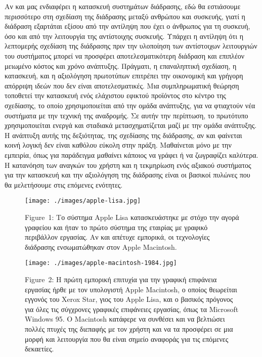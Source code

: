\documentclass[
]{article}
\begin{document}
Αν και μας ενδιαφέρει η κατασκευή συστημάτων διάδρασης, εδώ θα
εστιάσουμε περισσότερο στη σχεδίαση της διάδρασης μεταξύ ανθρώπου και
συσκευής, γιατί η διάδραση εξαρτάται εξίσου από την αντίληψη που έχει ο
άνθρωπος για τη συσκευή, όσο και από την λειτουργία της αντίστοιχης
συσκευής. Υπάρχει η αντίληψη ότι η λεπτομερής σχεδίαση της διάδρασης
πριν την υλοποίηση των αντίστοιχων λειτουργιών του συστήματος μπορεί να
προσφέρει αποτελεσματικότερη διάδραση και επιπλέον μειωμένο κόστος και
χρόνο ανάπτυξης. Πράγματι, η επαναληπτική σχεδίαση, η κατασκευή, και η
αξιολόγηση πρωτοτύπων επιτρέπει την οικονομική και γρήγορη απόρριψη
ιδεών που δεν είναι αποτελεσματικές. Μια συμπληρωματική θεώρηση
τοποθετεί την κατασκευή ενός ελάχιστου εφικτού προϊόντος στο κέντρο της
σχεδίασης, το οποίο χρησιμοποιείται από την ομάδα ανάπτυξης, για να
φτιαχτούν νέα συστήματα με την τεχνική της αναδρομής. Σε αυτήν την
περίπτωση, το πρωτότυπο χρησιμοποιείται ενεργά και σταδιακά
μετασχηματίζεται μαζί με την ομάδα ανάπτυξης. Η ανάπτυξη αυτής της
δεξιότητας, της σχεδίασης της διάδρασης, αν και φαίνεται κοινή λογική
δεν είναι καθόλου εύκολη στην πράξη. Μαθαίνεται μόνο με την εμπειρία,
όπως για παράδειγμα μαθαίνει κάποιος να γράφει ή να ζωγραφίζει καλύτερα.
Η κατανόηση των αναγκών του χρήστη και η τεκμηρίωση ενός αξιακού
συστήματος για την κατασκευή και την αξιολόγηση της διάδρασης είναι οι
βασικοί πυλώνες που θα μελετήσουμε στις επόμενες ενότητες.

\leavevmode{}%
\begin{figure}
\hypertarget{fig:apple-lisa}{%
\centering
\texttt{[image: ./images/apple-lisa.jpg]}
\caption{Figure~1: Το σύστημα Apple Lisa κατασκευάστηκε με στόχο την
αγορά γραφείου και ήταν το πρώτο σύστημα της εταιρίας με γραφικό
περιβάλλον εργασίας. Αν και απέτυχε εμπορικά, οι τεχνολογίες διάδρασης
ενσωματώθηκαν στον Apple Macintosh.}\label{fig:apple-lisa}
}
\end{figure}

\leavevmode{}%
\begin{figure}
\hypertarget{fig:apple-macintosh}{%
\centering
\texttt{[image: ./images/apple-macintosh-1984.jpg]}
\caption{Figure~2: Η πρώτη εμπορική επιτυχία για την γραφική επιφάνεια
εργασίας ήρθε με τον υπολογιστή Apple Macintosh, ο οποίος θεωρείται
εγγονός του Xerox Star, γιος του Apple Lisa, και ο βασικός πρόγονος για
όλες τις σύγχρονες γραφικές επιφάνειες εργασίας, όπως τα Microsoft
Windows 95. O Macintosh κατάφερε να συνθέσει και να βελτιώσει πολλές
πτυχές της διεπαφής με τον χρήστη και να τα προσφέρει σε μια μορφή και
λειτουργία που θα είναι σημείο αναφοράς για τις επόμενες
δεκαετίες.}\label{fig:apple-macintosh}
}
\end{figure}
\end{document}
